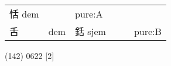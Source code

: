 \documentclass[14pt,a4paper]{scrartcl}
\begin{document}
\begin{longtable}[c]{@{}llllll@{}}
\begin{minipage}[t]{0.14\columnwidth}
恬 dem
\strut\end{minipage} &
\begin{minipage}[t]{0.14\columnwidth}\raggedright\strut
\strut\end{minipage} &
\begin{minipage}[t]{0.14\columnwidth}\raggedright\strut
pure:A
\strut\end{minipage}\tabularnewline
\begin{minipage}[t]{0.14\columnwidth}\raggedright\strut
舌
\strut\end{minipage} &
\begin{minipage}[t]{0.14\columnwidth}\raggedright\strut
dem
\strut\end{minipage} &
\begin{minipage}[t]{0.14\columnwidth}\raggedright\strut
銛 sjem
\strut\end{minipage} &
\begin{minipage}[t]{0.14\columnwidth}\raggedright\strut
\strut\end{minipage} &
\begin{minipage}[t]{0.14\columnwidth}\raggedright\strut
\strut\end{minipage} &
\begin{minipage}[t]{0.14\columnwidth}\raggedright\strut
pure:B
\strut\end{minipage}\tabularnewline
\bottomrule
\end{longtable}

(142) 0622 {[}2{]}
\end{document}
